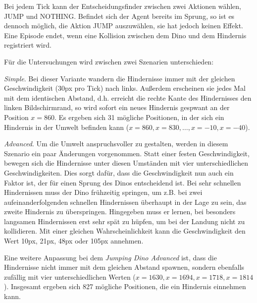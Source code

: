 Bei jedem Tick kann der Entscheidungsfinder zwischen zwei Aktionen wählen, JUMP und NOTHING. Befindet sich der Agent bereits im Sprung, so ist es dennoch möglich, die Aktion JUMP auszuwählen, sie hat jedoch keinen Effekt. Eine Episode endet, wenn eine Kollision zwischen dem Dino und dem Hindernis registriert wird.
\par 
Für die Untersuchungen wird zwischen zwei Szenarien unterschieden:
\par 
\textit{Simple}. Bei dieser Variante wandern die Hindernisse immer mit der gleichen Geschwindigkeit (30px pro Tick) nach links. Außerdem erscheinen sie jedes Mal mit dem identischen Abstand, d.h. erreicht die rechte Kante des Hindernisses den linken Bildschirmrand, so wird sofort ein neues Hindernis gespwant an der Position $x=860$. Es ergeben sich 31 mögliche Positionen, in der sich ein Hindernis in der Umwelt befinden kann ($x=860, x=830, \dots, x=-10, x=-40$).
\par 
\textit{Advanced}. Um die Umwelt anspruchsvoller zu gestalten, werden in diesem Szenario ein paar Änderungen vorgenommen. Statt einer festen Geschwindigkeit, bewegen sich die Hindernisse unter diesen Umständen mit vier unterschiedlichen Geschwindigkeiten. Dies sorgt dafür, dass die Geschwindigkeit nun auch ein Faktor ist, der für einen Sprung des Dinos entscheidend ist. Bei sehr schnellen Hindernissen muss der Dino frühzeitig springen, um z.B. bei zwei aufeinanderfolgenden schnellen Hindernissen überhaupt in der Lage zu sein, das zweite Hindernis zu überspringen. Hingegeben muss er lernen, bei besonders langsamen Hindernissen erst sehr spät zu hüpfen, um bei der Landung nicht zu kollidieren. Mit einer gleichen Wahrscheinlichkeit kann die Geschwindigkeit den Wert 10px, 21px, 48px oder 105px annehmen.
\par
Eine weitere Anpassung bei dem \textit{Jumping Dino Advanced} ist, dass die Hindernisse nicht immer mit dem gleichen Abstand spawnen, sondern ebenfalls zufällig mit vier unterschiedlichen Werten ($x=1630, x=1694, x=1718, x=1814$). Insgesamt ergeben sich 827 mögliche Positionen, die ein Hindernis einnehmen kann.


